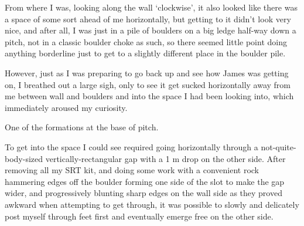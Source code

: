 

From where I was, looking along the wall `clockwise', it also looked
like there was a space of some sort ahead of me horizontally, but
getting to it didn't look very nice, and after all, I was just in a pile
of boulders on a big ledge half-way down a pitch, not in a classic
boulder choke as such, so there seemed little point doing anything
borderline just to get to a slightly different place in the boulder
pile.

However, just as I was preparing to go back up and see how James was
getting on, I breathed out a large sigh, only to see it get sucked
horizontally away from me between wall and boulders and into the space I
had been looking into, which immediately aroused my curiosity.


\begin{pagefigure}
\checkoddpage \ifoddpage \forcerectofloat \else \forceversofloat \fi
{}
\caption{One of the formations at the base of \protect{} pitch. }
\end{pagefigure}


To get into the space I could see required going horizontally through a
not-quite-body-sized vertically-rectangular gap with a 1 m drop on the other side. After removing all my SRT kit, and doing some work
with a convenient rock hammering edges off the boulder forming one side
of the slot to make the gap wider, and progressively blunting sharp
edges on the wall side as they proved awkward when attempting to get
through, it was possible to slowly and delicately post myself through
feet first and eventually emerge free on the other side.




